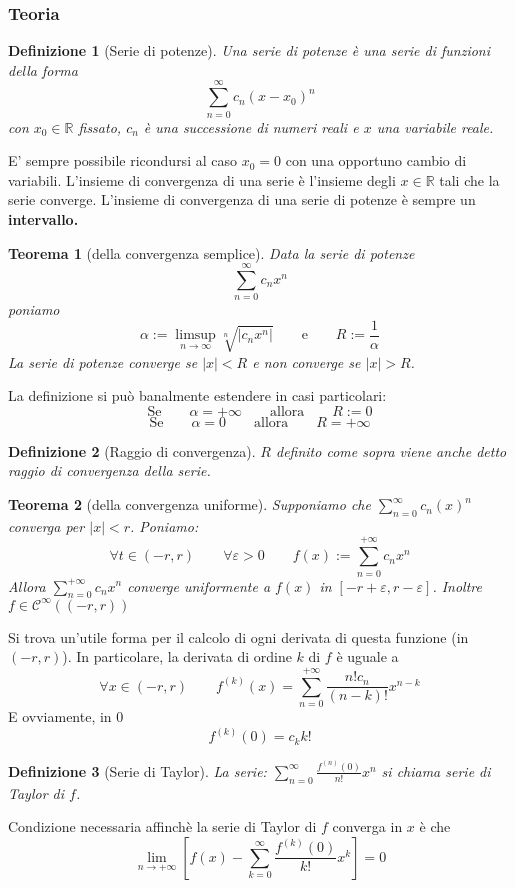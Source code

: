 \documentclass[a4paper,12pt]{article}
\newcommand{\cont}{\mathscr{C}}
\newtheorem{teo}{Teorema}
\newtheorem{defi}{Definizione}
\begin{document}
\subsubsection{Teoria}
\begin{defi}[Serie di potenze]
Una serie di potenze è una serie di funzioni della forma
$$\displaystyle \sum_{n=0}^\infty c_n\left(x-x_0\right)^n$$
con $x_0 \in \mathbb{R}$ fissato, ${c_n}$ è una successione di numeri reali e $x$ una variabile reale.
\end{defi}
E' sempre possibile ricondursi al caso $x_0 = 0$ con una opportuno cambio di variabili. L'insieme di convergenza di una serie è l'insieme degli $x \in \mathbb{R}$ tali che la serie converge. L'insieme di convergenza di una serie di potenze è sempre un \textbf{intervallo.}
\begin{teo}[della convergenza semplice]
Data la serie di potenze 
$$ \displaystyle \sum_{n=0}^\infty c_nx^n$$
poniamo $$ \alpha:=\limsup_{n\to \infty} \sqrt[n]{|c_n x^n|}\qquad \text{e}\qquad R:=\frac{1}{\alpha}$$
La serie di potenze converge se $|x|<R$ e non converge se $|x|>R$.
\end{teo}
La definizione si può banalmente estendere in casi particolari:
$$\text{Se}\qquad \alpha = +\infty\qquad \text{allora}\qquad R:=0$$
$$\text{Se}\qquad \alpha=0\qquad\text{allora}\qquad R=+\infty$$
\begin{defi}[Raggio di convergenza]
$R$ definito come sopra viene anche detto raggio di convergenza della serie.
\end{defi}
\begin{teo}[della convergenza uniforme]
Supponiamo che $ \displaystyle \sum_{n=0}^\infty c_n\left(x\right)^n$ converga per $|x|<r$. Poniamo:
$$ \forall t \in (-r,r)\qquad \forall \varepsilon > 0 \qquad f(x):= \displaystyle \sum_{n=0}^{+\infty} c_n x^n$$
Allora $\displaystyle \sum_{n=0}^{+\infty} c_n x^n$ converge uniformente a $f(x)$ in $[-r+\varepsilon,r-\varepsilon]$.
Inoltre $f \in \cont^\infty((-r,r))$
\end{teo}
Si trova un'utile forma per il calcolo di ogni derivata di questa funzione (in $(-r, r)$). In particolare, la derivata di ordine $k$ di $f$ è uguale a
$$\forall x \in (-r,r)\qquad f^{(k)}(x) = \displaystyle \sum_{n=0}^{+\infty}\frac{n!c_n}{(n-k)!}x^{n-k}$$
E ovviamente, in 0
$$f^{(k)}(0) = c_kk!$$ 

\begin{defi}[Serie di Taylor]
La serie:
$\displaystyle \sum_{n=0}^\infty \frac{f^{(n)}(0)}{n!} x^n$ si chiama serie di Taylor di $f$.
\end{defi}
Condizione necessaria affinchè la serie di Taylor di $f$ converga in  $x$ è che $$\lim_{n \to +\infty}\displaystyle \left[ f(x) - \displaystyle  \sum_{k=0}^\infty \frac{f^{(k)}(0)}{k!}x^k \right] = 0 $$
\end{document}
